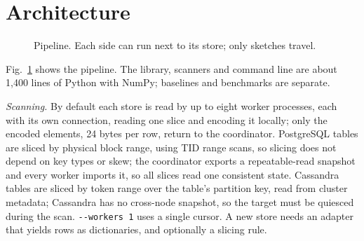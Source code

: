 \documentclass[conference]{IEEEtran}
\begin{document}
\section{Architecture}\label{sec:arch}
\begin{figure}[t]
\centering
{}
\caption{Pipeline. Each side can run next to its store; only sketches travel.}
\label{fig:arch}
\end{figure}

Fig.~\ref{fig:arch} shows the pipeline. The library, scanners and command line are about 1{,}400 lines of Python with NumPy; baselines and benchmarks are separate.

\emph{Scanning.} By default each store is read by up to eight worker processes, each with its own connection, reading one slice and encoding it locally; only the encoded elements, 24 bytes per row, return to the coordinator. PostgreSQL tables are sliced by physical block range, using TID range scans, so slicing does not depend on key types or skew; the coordinator exports a repeatable-read snapshot and every worker imports it, so all slices read one consistent state. Cassandra tables are sliced by token range over the table's partition key, read from cluster metadata; Cassandra has no cross-node snapshot, so the target must be quiesced during the scan. \texttt{-{}-workers 1} uses a single cursor. A new store needs an adapter that yields rows as dictionaries, and optionally a slicing rule.
\end{document}

